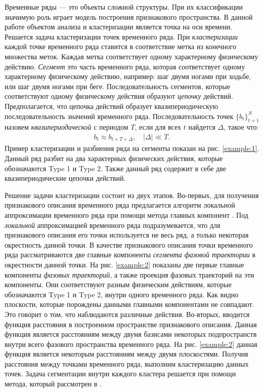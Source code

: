 Временные ряды --- это объекты сложной структуры. 
При их классификации значимую роль играет модель построения признакового пространства.
В данной работе объектом анализа и кластеризации является точка на оси времени. 
Решается задача кластеризации точек временного ряда. 
При \textit{кластеризации} каждой точке временного ряда ставится в соответствие метка из конечного множества меток. 
Каждая метка соответствует одному характерному физическому действию. \textit{Сегмент} это часть временного ряда, которая соответствует одному характерному физическому действию, например: шаг двумя ногами при ходьбе, или шаг двумя ногами при беге.
Последовательность сегментов, которые соответствуют одному физическому действия образуют \textit{цепочку} действий. 
Предполагается, что цепочка действий образует квазипериодическую последовательность значений временного ряда.
Последовательность точек $\{b_t\}_{t=1}^{N}$ назовем \textit{квазипериодической} с периодом $T$, если для всех $t$ найдется $\Delta$, такое что:
\[
\label{eq:int:1}
\begin{aligned}
b_t \approx b_{t+T+\Delta}, \quad \left|\Delta\right| \ll T.
\end{aligned}
\]
Пример кластеризации и разбиения ряда на сегменты показан на рис. \ref{example:1}. Данный ряд разбит на два характерных физических действия, которые обозначаются Type 1 и Type 2. Также данный ряд содержит в себе две квазипериодические цепочки действий.

Решение задачи кластеризации состоит из двух этапов. 
Во-первых, для получения признакового описания временного ряда предлагается алгоритм локальной аппроксимации временного ряда при помощи метода главных компонент \cite{Shiglavsi1997}. 
Под \textit{локальной} аппроксимацией временного ряда подразумевается, что для признакового описания его точки используется не весь ряд, а только некоторая окрестность данной точки. 
В качестве признакового описания точки временного ряда рассматриваются две главные компоненты \textit{сегмента фазовой траектории} в окрестности данной точки.
На рис. \ref{example:2} показаны две первые главные компоненты \textit{фазовых траекторий}, а также проекция фазовых траекторий на эти компоненты.
Они соответствуют разным физическим действиям, которые обозначаются Type 1 и Type 2, внутри одного временного ряда.
Как видно плоскости, которые порождены данными главными компонентами не совпадают. 
Это говорит о том, что наблюдаются различные действия. 
Во-вторых, вводится функция расстояния в построенном пространстве признакового описания. 
Данная функция является расстояниям между двумя базисами некоторых подпространств внутри всего фазового пространства временного ряда.
На рис. \ref{example:2} данная функция является некоторым расстояниям между двумя плоскостями.
Получив расстояния между точками временного ряда, выполним кластеризацию данных точек.
Задача сегментации внутри каждого кластера решается при помощи метода, который рассмотрен в \cite{motrenko2015}.

